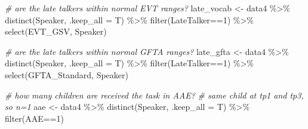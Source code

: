 \documentclass[
]{article}
\newenvironment{Shaded}{\begin{snugshade}}{\end{snugshade}}
\newcommand{\AttributeTok}[1]{\textcolor[rgb]{0.77,0.63,0.00}{#1}}
\newcommand{\CommentTok}[1]{\textcolor[rgb]{0.56,0.35,0.01}{\textit{#1}}}
\newcommand{\FunctionTok}[1]{\textcolor[rgb]{0.00,0.00,0.00}{#1}}
\newcommand{\NormalTok}[1]{#1}
\newcommand{\OtherTok}[1]{\textcolor[rgb]{0.56,0.35,0.01}{#1}}
\newcommand{\SpecialCharTok}[1]{\textcolor[rgb]{0.00,0.00,0.00}{#1}}
\newcommand{\StringTok}[1]{\textcolor[rgb]{0.31,0.60,0.02}{#1}}
\begin{document}
\begin{Shaded}
\begin{Highlighting}[]
\CommentTok{\# are the late talkers within normal EVT ranges?}
\NormalTok{late\_vocab }\OtherTok{\textless{}{-}}\NormalTok{ data4 }\SpecialCharTok{\%\textgreater{}\%}
  \FunctionTok{distinct}\NormalTok{(Speaker, }\AttributeTok{.keep\_all =}\NormalTok{ T) }\SpecialCharTok{\%\textgreater{}\%}
  \FunctionTok{filter}\NormalTok{(LateTalker}\SpecialCharTok{==}\StringTok{\textquotesingle{}1\textquotesingle{}}\NormalTok{) }\SpecialCharTok{\%\textgreater{}\%}
  \FunctionTok{select}\NormalTok{(EVT\_GSV, Speaker)}

\CommentTok{\# are the late talkers within normal GFTA ranges?}
\NormalTok{late\_gfta }\OtherTok{\textless{}{-}}\NormalTok{ data4 }\SpecialCharTok{\%\textgreater{}\%}
  \FunctionTok{distinct}\NormalTok{(Speaker, }\AttributeTok{.keep\_all =}\NormalTok{ T) }\SpecialCharTok{\%\textgreater{}\%}
  \FunctionTok{filter}\NormalTok{(LateTalker}\SpecialCharTok{==}\StringTok{\textquotesingle{}1\textquotesingle{}}\NormalTok{) }\SpecialCharTok{\%\textgreater{}\%}
  \FunctionTok{select}\NormalTok{(GFTA\_Standard, Speaker)}

\CommentTok{\# how many children are received the task in AAE?}
\CommentTok{\# same child at tp1 and tp3, so n=1}
\NormalTok{aae }\OtherTok{\textless{}{-}}\NormalTok{ data4 }\SpecialCharTok{\%\textgreater{}\%}
  \FunctionTok{distinct}\NormalTok{(Speaker, }\AttributeTok{.keep\_all =}\NormalTok{ T) }\SpecialCharTok{\%\textgreater{}\%}
  \FunctionTok{filter}\NormalTok{(AAE}\SpecialCharTok{==}\StringTok{\textquotesingle{}1\textquotesingle{}}\NormalTok{) }
\end{Highlighting}
\end{Shaded}
\end{document}
